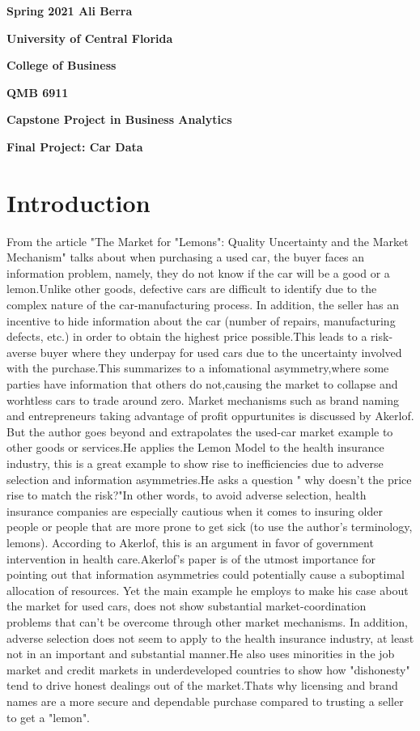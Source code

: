 \documentclass[11pt]{paper}
\begin{document}

\pagestyle{empty}
{\noindent\bf Spring 2021 \hfill Ali Berra}
\vskip 16pt
\centerline{\bf University of Central Florida}
\centerline{\bf College of Business}
\vskip 16pt
\centerline{\bf QMB 6911}
\centerline{\bf Capstone Project in Business Analytics}
\vskip 10pt
\centerline{\bf Final Project: Car Data}
\vskip 32pt
\noindent
% 

\section{Introduction}

From the article "The Market for "Lemons": Quality Uncertainty and the Market Mechanism" talks about when purchasing a used car, the buyer faces an information problem, namely, they do not know if the car will be a good or a lemon.Unlike other goods, defective cars are difficult to identify due to the complex nature of the car-manufacturing process. In addition, the seller has an incentive to hide information about the car (number of repairs, manufacturing defects, etc.) in order to obtain the highest price possible.This leads to a risk-averse buyer where they underpay for used cars due to the uncertainty involved with the purchase.This summarizes to a infomational asymmetry,where some parties have information that others do not,causing the market to collapse and worhtless cars to trade around zero.
Market mechanisms such as brand naming and entrepreneurs taking advantage of profit oppurtunites is discussed by Akerlof. But the author goes beyond and extrapolates the used-car market example to other goods or services.He applies the Lemon Model to the health insurance industry, this is a great example to show rise to inefficiencies due to adverse selection and information asymmetries.He asks a question " why doesn't the price rise to match the risk?"In other words, to avoid adverse selection, health insurance companies are especially cautious when it comes to insuring older people or people that are more prone to get sick (to use the author’s terminology, lemons). According to Akerlof, this is an argument in favor of government intervention in health care.Akerlof’s paper is of the utmost importance for pointing out that information asymmetries could potentially cause a suboptimal allocation of resources. Yet the main example he employs to make his case about the market for used cars, does not show substantial market-coordination problems that can’t be overcome through other market mechanisms. In addition, adverse selection does not seem to apply to the health insurance industry, at least not in an important and substantial manner.He also uses minorities in the job market and credit markets in underdeveloped countries to show how "dishonesty" tend to drive honest dealings out of the market.Thats why licensing and brand names are a more secure and dependable purchase compared to trusting a seller to get a "lemon".
\end{document}

